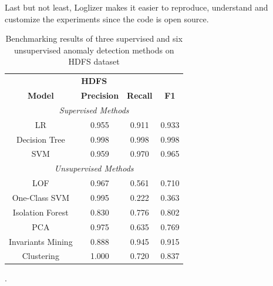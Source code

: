 Last but not least, Loglizer makes it easier to reproduce, understand and customize the experiments since the code is open source.

\begin{table}[h]
\centering
\begin{tabular}{@{}cccc@{}}
\toprule
\multicolumn{4}{c}{\textbf{HDFS}} \\ 
\textbf{Model}    & \textbf{Precision} & \textbf{Recall} & \textbf{F1} \\  \toprule \midrule
\multicolumn{4}{c}{\textit{Supervised Methods}}                        \\ \midrule
LR                & 0.955              & 0.911           & 0.933       \\
Decision Tree     & 0.998              & 0.998           & 0.998       \\
SVM               & 0.959              & 0.970           & 0.965       \\ \midrule
\multicolumn{4}{c}{\textit{Unsupervised Methods}}                      \\ \midrule
LOF      & 0.967              & 0.561           & 0.710       \\
One-Class SVM     & 0.995              & 0.222           & 0.363       \\
Isolation Forest  & 0.830              & 0.776           & 0.802       \\
PCA               & 0.975              & 0.635           & 0.769       \\
Invariants Mining & 0.888              & 0.945           & 0.915       \\
Clustering        & 1.000              & 0.720           & 0.837       \\ \bottomrule
\end{tabular}
\caption{Benchmarking results of three supervised and six unsupervised anomaly detection methods on HDFS dataset \cite{he2016}}.
\label{table:loglizer}
\end{table}

